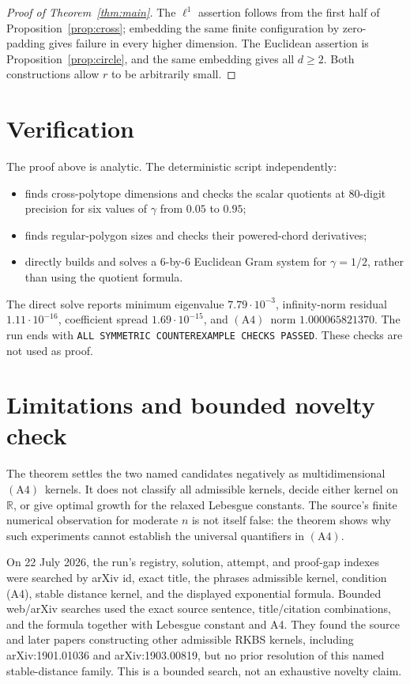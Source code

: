 \documentclass[11pt]{article}
\newcommand{\R}{\mathbb R}
\newcommand{\Afour}{\ensuremath{\mathrm{(A4)}}}
\begin{document}
\begin{proof}[Proof of Theorem~\ref{thm:main}]
The $\ell^1$ assertion follows from the first half of
Proposition~\ref{prop:cross}; embedding the same finite configuration by
zero-padding gives failure in every higher dimension.  The Euclidean
assertion is Proposition~\ref{prop:circle}, and the same embedding gives all
$d\geq2$.  Both constructions allow $r$ to be arbitrarily small.
\end{proof}

\section{Verification}

The proof above is analytic.  The deterministic script
 independently:
\begin{itemize}
\item finds cross-polytope dimensions and checks the scalar quotients at
80-digit precision for six values of $\gamma$ from $0.05$ to $0.95$;
\item finds regular-polygon sizes and checks their powered-chord derivatives;
\item directly builds and solves a $6$-by-$6$ Euclidean Gram system for
$\gamma=1/2$, rather than using the quotient formula.
\end{itemize}
The direct solve reports minimum eigenvalue
$7.79\cdot10^{-3}$, infinity-norm residual
$1.11\cdot10^{-16}$, coefficient spread
$1.69\cdot10^{-15}$, and \Afour\ norm $1.000065821370$.
The run ends with
\texttt{ALL SYMMETRIC COUNTEREXAMPLE CHECKS PASSED}.
These checks are not used as proof.

\section{Limitations and bounded novelty check}

The theorem settles the two named candidates negatively as multidimensional
\Afour\ kernels.  It does not classify all admissible kernels, decide either
kernel on $\R$, or give optimal growth for the relaxed Lebesgue constants.
The source's finite numerical observation for moderate $n$ is not itself
false: the theorem shows why such experiments cannot establish the universal
quantifiers in \Afour.

On 22 July 2026, the run's registry, solution, attempt, and proof-gap indexes
were searched by arXiv id, exact title, the phrases admissible kernel,
condition (A4), stable distance kernel, and the displayed exponential formula.
Bounded web/arXiv searches used the exact source sentence, title/citation
combinations, and the formula together with Lebesgue constant and A4.
They found the source and later papers constructing other admissible RKBS
kernels, including arXiv:1901.01036 and arXiv:1903.00819, but no prior
resolution of this named stable-distance family.  This is a bounded search,
not an exhaustive novelty claim.
\end{document}
